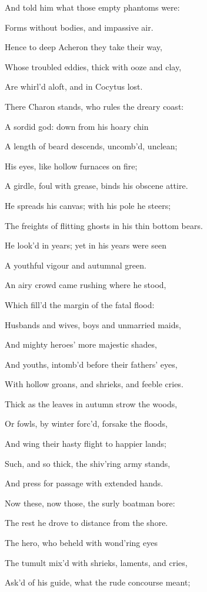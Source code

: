 And told him what those empty phantoms were:

Forms without bodies, and impassive air.

Hence to deep Acheron they take their way,

Whose troubled eddies, thick with ooze and clay,

Are whirl’d aloft, and in Cocytus lost.

There Charon stands, who rules the dreary coast:

A sordid god: down from his hoary chin

A length of beard descends, uncomb’d, unclean;

His eyes, like hollow furnaces on fire;

A girdle, foul with grease, binds his obscene attire.

He spreads his canvas; with his pole he steers;

The freights of flitting ghosts in his thin bottom bears.

He look’d in years; yet in his years were seen

A youthful vigour and autumnal green.

An airy crowd came rushing where he stood,

Which fill’d the margin of the fatal flood:

Husbands and wives, boys and unmarried maids,

And mighty heroes’ more majestic shades,

And youths, intomb’d before their fathers’ eyes,

With hollow groans, and shrieks, and feeble cries.

Thick as the leaves in autumn strow the woods,

Or fowls, by winter forc’d, forsake the floods,

And wing their hasty flight to happier lands;

Such, and so thick, the shiv’ring army stands,

And press for passage with extended hands.

Now these, now those, the surly boatman bore:

The rest he drove to distance from the shore.

The hero, who beheld with wond’ring eyes

The tumult mix’d with shrieks, laments, and cries,

Ask’d of his guide, what the rude concourse meant;

